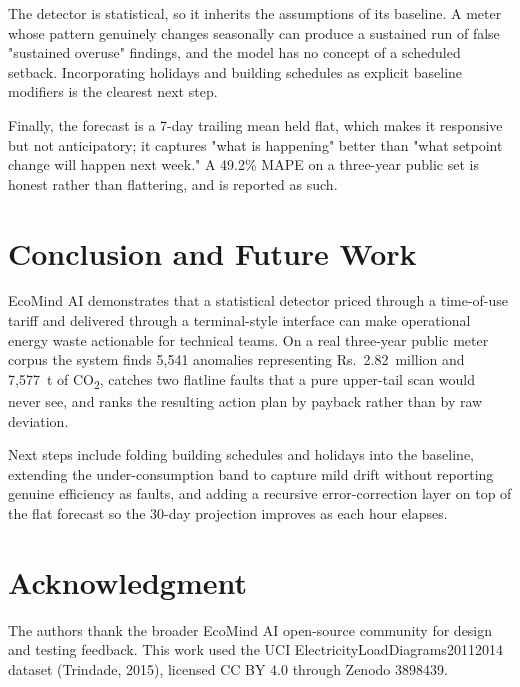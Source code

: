 \documentclass[conference, 10pt, a4paper]{IEEEtran}
\begin{document}
The detector is statistical, so it inherits the assumptions of its baseline.
A meter whose pattern genuinely changes seasonally can produce a sustained run
of false "sustained overuse" findings, and the model has no concept of a
scheduled setback. Incorporating holidays and building schedules as explicit
baseline modifiers is the clearest next step.

Finally, the forecast is a 7-day trailing mean held flat, which makes it
responsive but not anticipatory; it captures "what is happening" better than
"what setpoint change will happen next week." A 49.2\% MAPE on a three-year
public set is honest rather than flattering, and is reported as such.

\section{Conclusion and Future Work}

EcoMind AI demonstrates that a statistical detector priced through a
time-of-use tariff and delivered through a terminal-style interface can make
operational energy waste actionable for technical teams. On a real
three-year public meter corpus the system finds 5,541 anomalies representing
Rs.~2.82~million and 7,577~t of CO\textsubscript{2}, catches two flatline
faults that a pure upper-tail scan would never see, and ranks the resulting
action plan by payback rather than by raw deviation.

Next steps include folding building schedules and holidays into the baseline,
extending the under-consumption band to capture mild drift without reporting
genuine efficiency as faults, and adding a recursive error-correction layer
on top of the flat forecast so the 30-day projection improves as each hour
elapses.

\section*{Acknowledgment}
The authors thank the broader EcoMind AI open-source community for design
and testing feedback. This work used the UCI ElectricityLoadDiagrams20112014
dataset (Trindade, 2015), licensed CC BY 4.0 through Zenodo 3898439.
\end{document}
